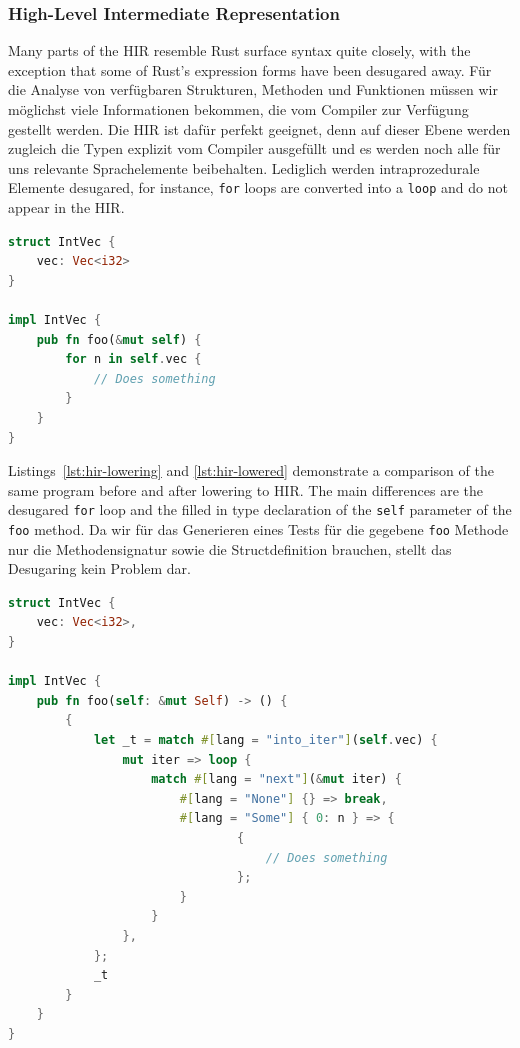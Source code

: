 \documentclass{article}
\begin{document}
\subsubsection{High-Level Intermediate Representation}
Many parts of the \ac{HIR} resemble Rust surface syntax quite closely, with the exception that some of Rust's expression forms have been desugared away. Für die Analyse von verfügbaren Strukturen, Methoden und Funktionen müssen wir möglichst viele Informationen bekommen, die vom Compiler zur Verfügung gestellt werden. Die \ac{HIR} ist dafür perfekt geeignet, denn auf dieser Ebene werden zugleich die Typen explizit vom Compiler ausgefüllt und es werden noch alle für uns relevante Sprachelemente beibehalten. Lediglich werden intraprozedurale Elemente desugared, for instance, \lstinline{for} loops are converted into a \lstinline{loop} and do not appear in the \ac{HIR}.
\begin{lstlisting}[language=Rust, style=boxed, caption={An example Rust program that we convert to HIR}, label=lst:hir-lowering]
struct IntVec {
    vec: Vec<i32>
}

impl IntVec {
    pub fn foo(&mut self) {
        for n in self.vec {
            // Does something
        }
    }
}
\end{lstlisting}

Listings~\ref{lst:hir-lowering} and \ref{lst:hir-lowered} demonstrate a comparison of the same program before and after lowering to \ac{HIR}. The main differences are the desugared \lstinline{for} loop and the filled in type declaration of the \lstinline{self} parameter of the \lstinline{foo} method. Da wir für das Generieren eines Tests für die gegebene \lstinline{foo} Methode nur die Methodensignatur sowie die Structdefinition brauchen, stellt das Desugaring kein Problem dar.

\begin{lstlisting}[language=Rust, style=boxed, caption={HIR of the code in Listing~\ref{lst:hir-lowering}}, label=lst:hir-lowered]
struct IntVec {
    vec: Vec<i32>,
}

impl IntVec {
    pub fn foo(self: &mut Self) -> () {
        {
            let _t = match #[lang = "into_iter"](self.vec) {
                mut iter => loop {
                    match #[lang = "next"](&mut iter) {
                        #[lang = "None"] {} => break,
                        #[lang = "Some"] { 0: n } => {
                                {
                                    // Does something
                                };
                        }
                    }
                },
            };
            _t
        }
    }
}
\end{lstlisting}
\end{document}
